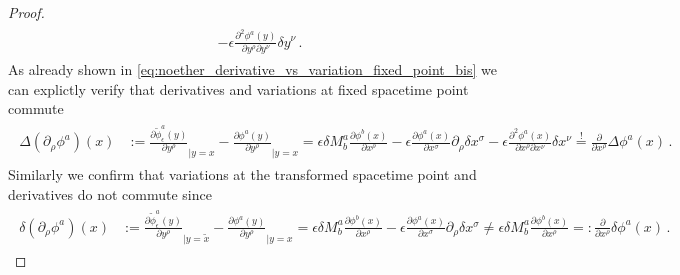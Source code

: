 \documentclass[../QFT_main.tex]{subfiles}
\begin{document}
\begin{proof}
{\begin{align}
\begin{aligned}
    -\epsilon \tfrac{\partial^2 \phi^a(y)}{\partial y^\rho \partial y^\nu} \delta y^\nu\,.
\end{aligned}
\end{align}}
As already shown in \eqref{eq:noether_derivative_vs_variation_fixed_point_bis} we can explictly verify that derivatives and variations at fixed spacetime point commute
{\small\begin{align}\label{eq:noether_derivative_vs_variation_fixed_point}
\begin{aligned}
    \Delta(\partial_\rho\phi^a)(x)&:= \tfrac{\partial\tilde{\phi}_\epsilon^a(y)}{\partial y^\rho}_{\mid y=x}-\tfrac{\partial{\phi}^a(y)}{\partial y^\rho}_{\mid y=x}
    = \epsilon \delta M^a_b \tfrac{\partial \phi^b(x)}{\partial x^\rho}
    -\epsilon \tfrac{\partial \phi^a(x)}{\partial x^\sigma}\partial_\rho\delta x^\sigma
    -\epsilon \tfrac{\partial^2 \phi^a(x)}{\partial x^\rho \partial x^\nu} \delta x^\nu
    {\overset{!}{=}} \tfrac{\partial}{\partial x^\rho}\Delta\phi^a(x)\,.
\end{aligned}
\end{align}}
Similarly we confirm that variations at the transformed spacetime point and derivatives do not commute since
{\small\begin{align}
\begin{aligned}
    \delta(\partial_\rho\phi^a)(x)&:= \tfrac{\partial\tilde{\phi}_\epsilon^a(y)}{\partial y^\rho}_{\mid y=\tilde{x}}-\tfrac{\partial{\phi}^a(y)}{\partial y^\rho}_{\mid y=x}
    = \epsilon \delta M^a_b \tfrac{\partial \phi^b(x)}{\partial x^\rho}
    -\epsilon \tfrac{\partial \phi^a(x)}{\partial x^\sigma}\partial_\rho\delta x^\sigma
    \neq 
    \epsilon \delta M^a_b \tfrac{\partial \phi^b(x)}{\partial x^\rho}
    =:\tfrac{\partial}{\partial x^\rho}\delta\phi^a(x)\,.
\end{aligned}
\end{align}}
%
\end{proof}
\end{document}
